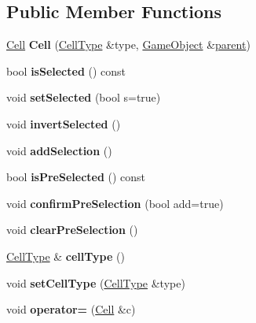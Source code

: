 \subsection*{\-Public \-Member \-Functions}
\begin{DoxyCompactItemize}
\item 
\hypertarget{class_cell_a2d51e1181f3606c036965b5568fbb8ec}{\hyperlink{class_cell}{\-Cell} {\bfseries \-Cell} (\hyperlink{class_cell_type}{\-Cell\-Type} \&type, \hyperlink{class_game_object}{\-Game\-Object} \&\hyperlink{class_game_object_af3deaf39cde23c189765634e32e95bb4}{parent})}\label{class_cell_a2d51e1181f3606c036965b5568fbb8ec}

\item 
\hypertarget{class_cell_a394830e18401f3b414c3dde4a2b4e2e8}{bool {\bfseries is\-Selected} () const }\label{class_cell_a394830e18401f3b414c3dde4a2b4e2e8}

\item 
\hypertarget{class_cell_a40146bbb2b74cf56337462abc4d0327c}{void {\bfseries set\-Selected} (bool s=true)}\label{class_cell_a40146bbb2b74cf56337462abc4d0327c}

\item 
\hypertarget{class_cell_ad8310bd5ddbdcb3ab3036356556b32b3}{void {\bfseries invert\-Selected} ()}\label{class_cell_ad8310bd5ddbdcb3ab3036356556b32b3}

\item 
\hypertarget{class_cell_a9801c2d435d44834bd14a80fba778618}{void {\bfseries add\-Selection} ()}\label{class_cell_a9801c2d435d44834bd14a80fba778618}

\item 
\hypertarget{class_cell_aa7456089022c5d2dabd4325d03007759}{bool {\bfseries is\-Pre\-Selected} () const }\label{class_cell_aa7456089022c5d2dabd4325d03007759}

\item 
\hypertarget{class_cell_a16f6d41be75c42ad20ad29d0b5725ece}{void {\bfseries confirm\-Pre\-Selection} (bool add=true)}\label{class_cell_a16f6d41be75c42ad20ad29d0b5725ece}

\item 
\hypertarget{class_cell_aa0704872b8d4ae7f40022cfebfa48944}{void {\bfseries clear\-Pre\-Selection} ()}\label{class_cell_aa0704872b8d4ae7f40022cfebfa48944}

\item 
\hypertarget{class_cell_ac934ce0c192eec56e41f0572b95e4c41}{\hyperlink{class_cell_type}{\-Cell\-Type} \& {\bfseries cell\-Type} ()}\label{class_cell_ac934ce0c192eec56e41f0572b95e4c41}

\item 
\hypertarget{class_cell_aa7247ed72579ece05d6937de36ad5d55}{void {\bfseries set\-Cell\-Type} (\hyperlink{class_cell_type}{\-Cell\-Type} \&type)}\label{class_cell_aa7247ed72579ece05d6937de36ad5d55}

\item 
\hypertarget{class_cell_acf848c9fd299845d425821ccfb48a718}{void {\bfseries operator=} (\hyperlink{class_cell}{\-Cell} \&c)}\label{class_cell_acf848c9fd299845d425821ccfb48a718}

\end{DoxyCompactItemize}
